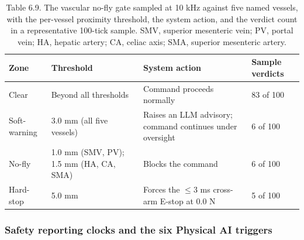 \begin{table}[t]
\caption{Table 6.9. The vascular no-fly gate sampled at 10 kHz against five named
vessels, with the per-vessel proximity threshold, the system action, and the verdict
count in a representative 100-tick sample. SMV, superior mesenteric vein; PV, portal
vein; HA, hepatic artery; CA, celiac axis; SMA, superior mesenteric artery.}
\label{tab:sec06-vascular}
\centering
\begin{tabularx}{\textwidth}{L{3.0cm} L{4.2cm} Y C{2.0cm}}
\toprule
\textbf{Zone} & \textbf{Threshold} & \textbf{System action} & \textbf{Sample verdicts} \\
\midrule
Clear & Beyond all thresholds & Command proceeds normally & 83 of 100 \\
Soft-warning & 3.0 mm (all five vessels) & Raises an LLM advisory; command continues under oversight & 6 of 100 \\
No-fly & 1.0 mm (SMV, PV); 1.5 mm (HA, CA, SMA) & Blocks the command & 6 of 100 \\
Hard-stop & 5.0 mm & Forces the $\leq 3$ ms cross-arm E-stop at 0.0 N & 5 of 100 \\
\bottomrule
\end{tabularx}
\end{table}

\subsubsection*{Safety reporting clocks and the six Physical AI triggers}

